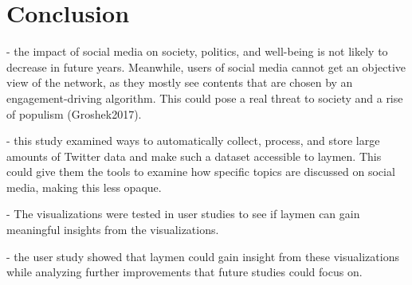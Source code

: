 \section{Conclusion}

- the impact of social media on society, politics, and well-being is not likely to decrease in future years. Meanwhile, users of social media cannot get an objective view of the network, as they mostly see contents that are chosen by an engagement-driving algorithm. This could pose a real threat to society and a rise of populism (Groshek2017).

- this study examined ways to automatically collect, process, and store large amounts of Twitter data and make such a dataset accessible to laymen. This could give them the tools to examine how specific topics are discussed on social media, making this less opaque.

- The visualizations were tested in user studies to see if laymen can gain meaningful insights from the visualizations.

- the user study showed that laymen could gain insight from these visualizations while analyzing further improvements that future studies could focus on.